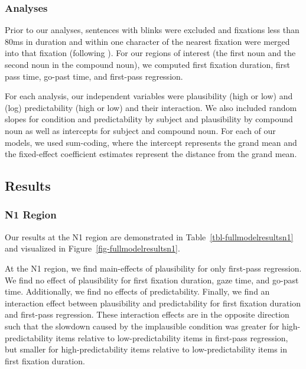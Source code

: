 \documentclass[
  12pt,
  letterpaper,
]{scrreprt}
\begin{document}
\subsubsection{Analyses}\label{analyses-1}

Prior to our analyses, sentences with blinks were excluded and fixations
less than 80ms in duration and within one character of the nearest
fixation were merged into that fixation (following
). For
our regions of interest (the first noun and the second noun in the
compound noun), we computed first fixation duration, first pass time,
go-past time, and first-pass regression.

For each analysis, our independent variables were plausibility (high or
low) and (log) predictability (high or low) and their interaction. We
also included random slopes for condition and predictability by subject
and plausibility by compound noun as well as intercepts for subject and
compound noun. For each of our models, we used sum-coding, where the
intercept represents the grand mean and the fixed-effect coefficient
estimates represent the distance from the grand mean.

\subsection{Results}\label{results-3}

\subsubsection{N1 Region}\label{n1-region-1}

Our results at the N1 region are demonstrated in
Table~\ref{tbl-fullmodelresultsn1} and visualized in
Figure~\ref{fig-fullmodelresultsn1}.

At the N1 region, we find main-effects of plausibility for only
first-pass regression. We find no effect of plausibility for first
fixation duration, gaze time, and go-past time. Additionally, we find no
effects of predictability. Finally, we find an interaction effect
between plausibility and predictability for first fixation duration and
first-pass regression. These interaction effects are in the opposite
direction such that the slowdown caused by the implausible condition was
greater for high-predictability items relative to low-predictability
items in first-pass regression, but smaller for high-predictability
items relative to low-predictability items in first fixation duration.
\end{document}
